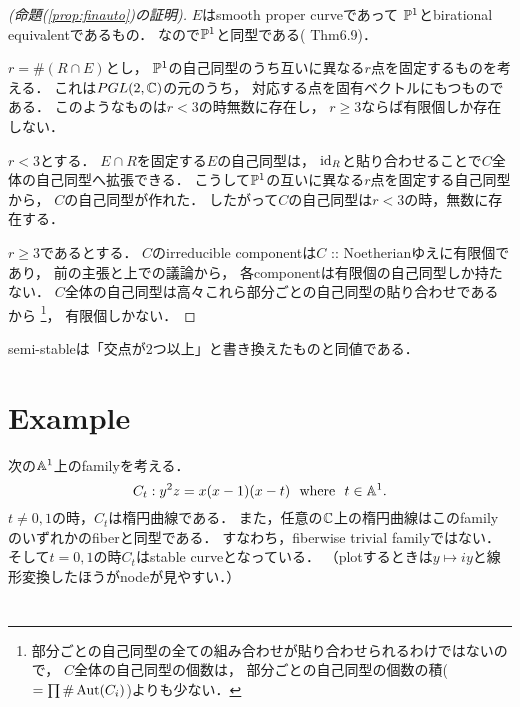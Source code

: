 \documentclass[a4paper]{jsarticle}
\begin{document}
    \begin{proof}[(命題(\ref{prop:finauto})の証明)]
        $E$はsmooth proper curveであって
        $\proj^1$とbirational equivalentであるもの．
        なので$\proj^1$と同型である(\cite{HarAG} Thm6.9)．

        $r=\# (R \cap E)$とし，
        $\proj^1$の自己同型のうち互いに異なる$r$点を固定するものを考える．
        これは$PGL(2, \C)$の元のうち，
        対応する点を固有ベクトルにもつものである．
        このようなものは$r<3$の時無数に存在し，
        $r \geq 3$ならば有限個しか存在しない．
        
        $r<3$とする．
        $E \cap R$を固定する$E$の自己同型は，
        $\id[R]$と貼り合わせることで$C$全体の自己同型へ拡張できる．
        こうして$\proj^1$の互いに異なる$r$点を固定する自己同型から，
        $C$の自己同型が作れた．
        したがって$C$の自己同型は$r<3$の時，無数に存在する．

        $r \geq 3$であるとする．
        $C$のirreducible componentは$C$ :: Noetherianゆえに有限個であり，
        前の主張と上での議論から，
        各componentは有限個の自己同型しか持たない．
        $C$全体の自己同型は高々これら部分ごとの自己同型の貼り合わせであるから
        \footnote
        {
            部分ごとの自己同型の全ての組み合わせが貼り合わせられるわけではないので，
            $C$全体の自己同型の個数は，
            部分ごとの自己同型の個数の積($=\prod \#\Aut(C_i)$)よりも少ない．
        }，
        有限個しかない．
    \end{proof}

    semi-stableは「交点が$2$つ以上」と書き換えたものと同値である．

\section{Example}
    \begin{Example}
        次の$\affine^1$上のfamilyを考える．
        \[ C_t: y^2z=x(x-1)(x-t) \mwhere t \in \affine^1. \]
        $t \neq 0,1$の時，$C_t$は楕円曲線である．
        また，任意の$\C$上の楕円曲線はこのfamilyのいずれかのfiberと同型である．
        すなわち，fiberwise trivial familyではない．
        そして$t=0,1$の時$C_t$はstable curveとなっている．
        （plotするときは$y \mapsto iy$と線形変換したほうがnodeが見やすい．）
    \end{Example}

\section{}
\end{document}
